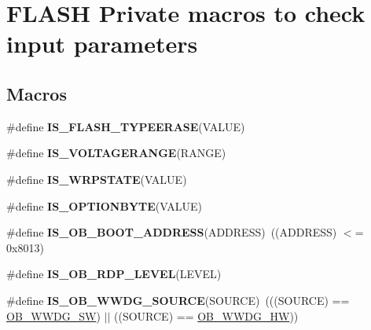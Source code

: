 \hypertarget{group___f_l_a_s_h_ex___i_s___f_l_a_s_h___definitions}{}\section{F\+L\+A\+SH Private macros to check input parameters}
\label{group___f_l_a_s_h_ex___i_s___f_l_a_s_h___definitions}
\subsection*{Macros}
\begin{DoxyCompactItemize}
\item 
\#define {\bfseries I\+S\+\_\+\+F\+L\+A\+S\+H\+\_\+\+T\+Y\+P\+E\+E\+R\+A\+SE}(V\+A\+L\+UE)
\item 
\#define {\bfseries I\+S\+\_\+\+V\+O\+L\+T\+A\+G\+E\+R\+A\+N\+GE}(R\+A\+N\+GE)
\item 
\#define {\bfseries I\+S\+\_\+\+W\+R\+P\+S\+T\+A\+TE}(V\+A\+L\+UE)
\item 
\#define {\bfseries I\+S\+\_\+\+O\+P\+T\+I\+O\+N\+B\+Y\+TE}(V\+A\+L\+UE)
\item 
\mbox{\label{group___f_l_a_s_h_ex___i_s___f_l_a_s_h___definitions_gac1673536ea261ec834af6e3733f58231}} 
\#define {\bfseries I\+S\+\_\+\+O\+B\+\_\+\+B\+O\+O\+T\+\_\+\+A\+D\+D\+R\+E\+SS}(A\+D\+D\+R\+E\+SS)~((A\+D\+D\+R\+E\+SS) $<$= 0x8013)
\item 
\#define {\bfseries I\+S\+\_\+\+O\+B\+\_\+\+R\+D\+P\+\_\+\+L\+E\+V\+EL}(L\+E\+V\+EL)
\item 
\mbox{\label{group___f_l_a_s_h_ex___i_s___f_l_a_s_h___definitions_ga63f7cf33d65b3edd7631ee44da2272b5}} 
\#define {\bfseries I\+S\+\_\+\+O\+B\+\_\+\+W\+W\+D\+G\+\_\+\+S\+O\+U\+R\+CE}(S\+O\+U\+R\+CE)~(((S\+O\+U\+R\+CE) == \mbox{\hyperlink{group___f_l_a_s_h_ex___option___bytes___w_watchdog_ga1e5f3b6d137856b1acc34e7dbc81ffd9}{O\+B\+\_\+\+W\+W\+D\+G\+\_\+\+SW}}) $\vert$$\vert$ ((S\+O\+U\+R\+CE) == \mbox{\hyperlink{group___f_l_a_s_h_ex___option___bytes___w_watchdog_ga32aa93fb6a71b73966b2bf934927835f}{O\+B\+\_\+\+W\+W\+D\+G\+\_\+\+HW}}))
\item 
\mbox{\label{group___f_l_a_s_h_ex___i_s___f_l_a_s_h___definitions_gaf2871652c08e76499d9449be6556f12c}} 
$$
\end{DoxyCompactItemize}
